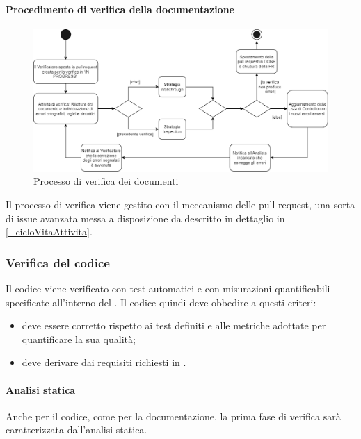 \paragraph{Procedimento di verifica della documentazione}
\begin{figure}[h!]
    \includegraphics[width=\linewidth]{res/images/processo_verifica.png}
    \caption{Processo di verifica  dei documenti}
\end{figure}
Il processo di verifica viene gestito con il meccanismo delle pull request, una sorta di issue avanzata messa a disposizione da  descritto in dettaglio in \ref{_cicloVitaAttivita}.

\subsubsection{Verifica del codice}
Il codice viene verificato con test automatici e con misurazioni quantificabili specificate all'interno del . Il codice quindi deve obbedire a questi criteri:
\begin{itemize}
    \item deve essere corretto rispetto ai test definiti e alle metriche adottate per quantificare la sua qualità;
    \item deve derivare dai requisiti richiesti in .
\end{itemize}

\paragraph{Analisi statica}
Anche per il codice, come per la documentazione, la prima fase di verifica sarà caratterizzata dall'analisi statica. %

